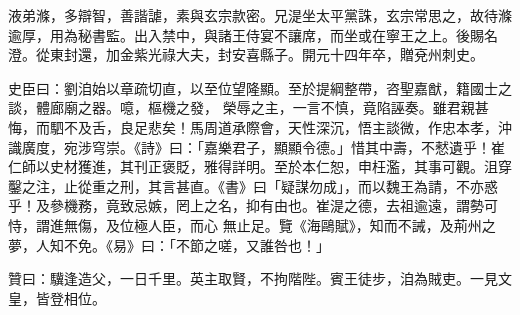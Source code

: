 \begin{pinyinscope}
 液弟滌，多辯智，善諧謔，素與玄宗款密。兄湜坐太平黨誅，玄宗常思之，故待滌逾厚，用為秘書監。出入禁中，與諸王侍宴不讓席，而坐或在寧王之上。後賜名澄。從東封還，加金紫光祿大夫，封安喜縣子。開元十四年卒，贈兗州刺史。



 史臣曰：劉洎始以章疏切直，以至位望隆顯。至於提綱整帶，咨聖嘉猷，籍國士之談，體廊廟之器。噫，樞機之發，
 榮辱之主，一言不慎，竟陷誣奏。雖君親甚悔，而駟不及舌，良足悲矣！馬周道承際會，天性深沉，悟主談微，作忠本孝，沖識廣度，宛涉穹崇。《詩》曰：「嘉樂君子，顯顯令德。」惜其中壽，不憖遺乎！崔仁師以史材獲進，其刊正褒貶，雅得詳明。至於本仁恕，申枉濫，其事可觀。沮穿鑿之注，止從重之刑，其言甚直。《書》曰「疑謀勿成」，而以魏王為請，不亦惑乎！及參機務，竟致忌嫉，罔上之名，抑有由也。崔湜之德，去祖逾遠，謂勢可恃，謂進無傷，及位極人臣，而心
 無止足。覽《海鷗賦》，知而不誡，及荊州之夢，人知不免。《易》曰：「不節之嗟，又誰咎也！」



 贊曰：驥逢造父，一日千里。英主取賢，不拘階陛。賓王徒步，洎為賊吏。一見文皇，皆登相位。



\end{pinyinscope}